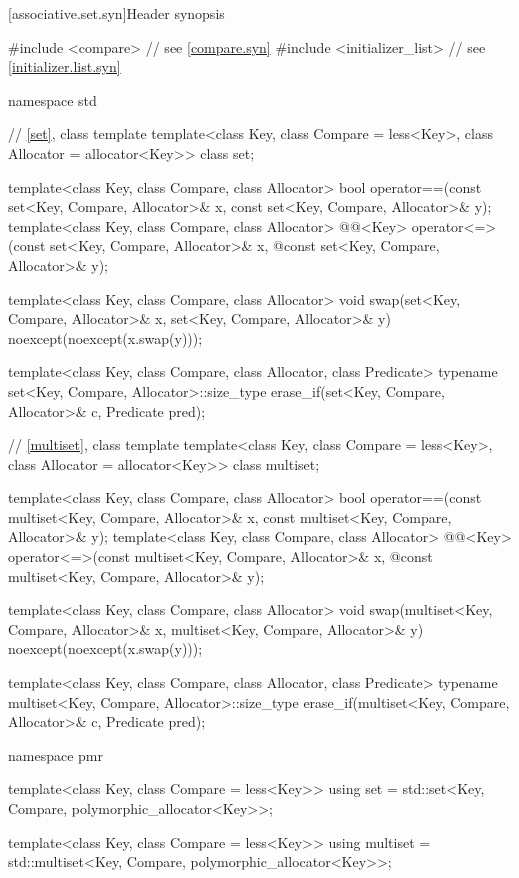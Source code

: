[associative.set.syn]{Header  synopsis}%

%
\begin{codeblock}
#include <compare>              // see \ref{compare.syn}
#include <initializer_list>     // see \ref{initializer.list.syn}

namespace std {
  // \ref{set}, class template 
  template<class Key, class Compare = less<Key>, class Allocator = allocator<Key>>
    class set;

  template<class Key, class Compare, class Allocator>
    bool operator==(const set<Key, Compare, Allocator>& x,
                    const set<Key, Compare, Allocator>& y);
  template<class Key, class Compare, class Allocator>
    @@<Key> operator<=>(const set<Key, Compare, Allocator>& x,
    @\itcorr@                                        const set<Key, Compare, Allocator>& y);

  template<class Key, class Compare, class Allocator>
    void swap(set<Key, Compare, Allocator>& x,
              set<Key, Compare, Allocator>& y)
      noexcept(noexcept(x.swap(y)));

  template<class Key, class Compare, class Allocator, class Predicate>
    typename set<Key, Compare, Allocator>::size_type
      erase_if(set<Key, Compare, Allocator>& c, Predicate pred);

  // \ref{multiset}, class template 
  template<class Key, class Compare = less<Key>, class Allocator = allocator<Key>>
    class multiset;

  template<class Key, class Compare, class Allocator>
    bool operator==(const multiset<Key, Compare, Allocator>& x,
                    const multiset<Key, Compare, Allocator>& y);
  template<class Key, class Compare, class Allocator>
    @@<Key> operator<=>(const multiset<Key, Compare, Allocator>& x,
    @\itcorr@                                        const multiset<Key, Compare, Allocator>& y);

  template<class Key, class Compare, class Allocator>
    void swap(multiset<Key, Compare, Allocator>& x,
              multiset<Key, Compare, Allocator>& y)
      noexcept(noexcept(x.swap(y)));

  template<class Key, class Compare, class Allocator, class Predicate>
    typename multiset<Key, Compare, Allocator>::size_type
      erase_if(multiset<Key, Compare, Allocator>& c, Predicate pred);

  namespace pmr {
    template<class Key, class Compare = less<Key>>
      using set = std::set<Key, Compare, polymorphic_allocator<Key>>;

    template<class Key, class Compare = less<Key>>
      using multiset = std::multiset<Key, Compare, polymorphic_allocator<Key>>;
  }
}
\end{codeblock}

